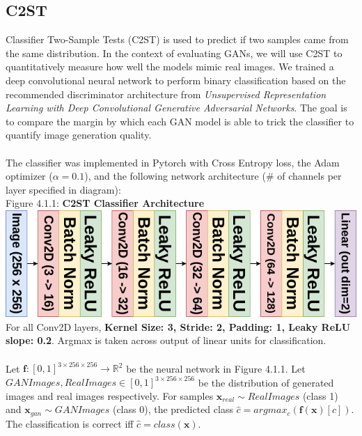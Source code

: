 \documentclass[10pt]{article}
\begin{document}
\begin{multicols*}{2}
        \subsection{C2ST}
        \label{subsec:c2st}
        Classifier Two-Sample Tests (C2ST) is used to predict if two samples came from the same distribution\cite{c2st}.
        In the context of evaluating GANs, we will use C2ST to quantitatively measure how well the models mimic real images.
        We trained a deep convolutional neural network to perform binary classification based on the recommended discriminator architecture from \textit{Unsupervised Representation Learning
with Deep Convolutional Generative Adversarial Networks}\cite{dcgan}.
        The goal is to compare the margin by which each GAN model is able to trick the classifier to quantify image generation quality.
        \\\\
        The classifier was implemented in Pytorch with Cross Entropy loss, the Adam optimizer ($\alpha=0.1$), and the following network architecture (\# of channels per layer specified in diagram):\\
        Figure 4.1.1: \textbf{C2ST Classifier Architecture}\\
        \includegraphics[scale=0.4]{c2st-diagram.png}\\
        For all Conv2D layers, \textbf{Kernel Size: 3, Stride: 2, Padding: 1, Leaky ReLU slope: 0.2}.
        Argmax is taken across output of linear units for classification.
        \\\\
        Let $\mathbf{f}: [0, 1]^{3 \times 256 \times 256} \rightarrow \mathbb{R}^{2}$ be the neural network in Figure 4.1.1. 
        Let $GANImages, RealImages \in [0, 1]^{3 \times 256 \times 256}$ be the distribution of generated images and real images respectively. For samples $\mathbf{x}_{real} \sim RealImages$ (class 1) and $\mathbf{x}_{gan} \sim GANImages$ (class 0), the predicted class $\hat{c} =argmax_c (\mathbf{f}(\mathbf{x})[c])$. The classification is correct iff $\hat{c} = class(\mathbf{x})$.
        \\

\end{multicols*}
\end{document}
